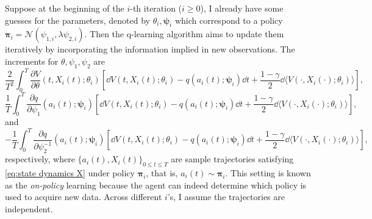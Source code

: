 Suppose at the beginning of the $i$-th iteration ($i\geq 0$), I already have some guesses for the parameters, denoted by $\theta_i,\bm\psi_i$ which correspond to a policy $\bm\pi_i = \mathcal{N}(\psi_{1,i},\lambda\psi_{2,i})$. Then the q-learning algorithm aims to update them iteratively by incorporating the information implied in new observations. 
The increments for $\theta,\psi_1,\psi_2$ are
\begin{equation}
	\label{eq:update theta}
	\frac{2}{T^2}	\int_0^T \frac{\partial V}{\partial \theta}\left(t, X_i(t);\theta_i \right) \left[ \dd V\left(t , X_i(t);\theta_i  \right) - q\left(a_i(t) ;\bm\psi_i\right)\dd t + \frac{1-\gamma}{2}\dd \langle V\left(\cdot , X_i(\cdot);\theta_i  \right) \rangle  \right],
\end{equation}
\begin{equation}
	\label{eq:update psi 1}
	\frac{1}{T}	\int_0^T \frac{\partial q}{\partial \psi_1}\left(a_i(t);\bm\psi_i \right) \left[ \dd V\left(t , X_i(t);\theta_i  \right) - q\left(a_i(t) ;\bm\psi_i\right)\dd t + \frac{1-\gamma}{2}\dd \langle V\left(\cdot , X_i(\cdot);\theta_i  \right) \rangle  \right],
\end{equation}
and
\begin{equation}
	\label{eq:update psi 2}
	-\frac{1}{T}\int_0^T \frac{\partial q}{\partial \psi_2^{-1}}\left(a_i(t);\bm\psi_i \right) \left[ \dd V\left(t , X_i(t);\theta_i  \right) - q\left(a_i(t) ;\bm\psi_i\right)\dd t + \frac{1-\gamma}{2}\dd \langle V\left(\cdot , X_i(\cdot);\theta_i  \right) \rangle  \right],
\end{equation}
respectively, where $\{ a_i(t), X_i(t) \}_{0\leq t\leq T}$ are sample trajectories satisfying \eqref{eq:state dynamics X} under policy $\bm\pi_i$, that is, $a_i(t) \sim \bm\pi_i$. This setting is known as the \textit{on-policy} learning because the agent can indeed determine which policy is used to acquire new data.  Across different $i$'s, I assume the trajectories are independent. 

